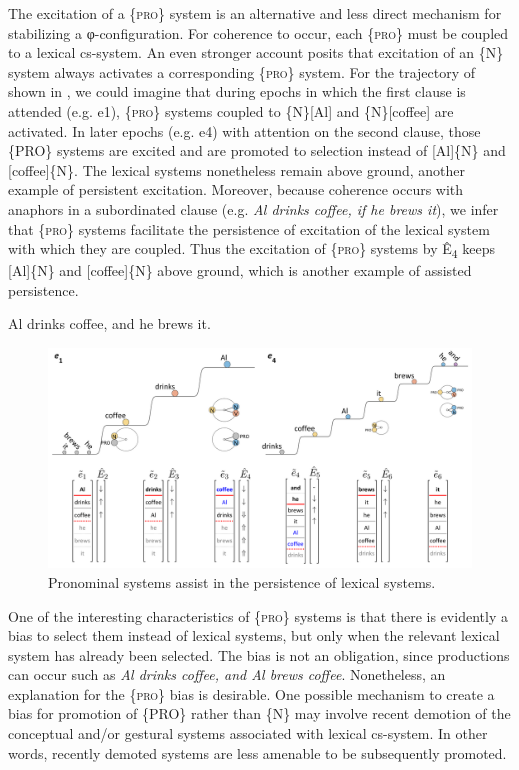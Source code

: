   The excitation of a \{\textsc{pro}\} system is an alternative and less direct mechanism for stabilizing a φ-configuration. For coherence to occur, each \{\textsc{pro}\} must be coupled to a lexical cs-system. An even stronger account posits that excitation of an \{N\} system always activates a corresponding \{\textsc{pro}\} system. For the trajectory of  shown in {}, we could imagine that during epochs in which the first clause is attended (e.g. e1), \{\textsc{pro}\} systems coupled to \{N\}[Al] and \{N\}[coffee] are activated. In later epochs (e.g. e4) with attention on the second clause, those \{PRO\} systems are excited and are promoted to selection instead of [Al]\{N\} and [coffee]\{N\}. The lexical systems nonetheless remain above ground, another example of persistent excitation. Moreover, because coherence occurs with anaphors in a subordinated clause (e.g. \textit{Al drinks coffee, if he brews it}), we infer that \{\textsc{pro}\} systems facilitate the persistence of excitation of the lexical system with which they are coupled. Thus the excitation of \{\textsc{pro}\} systems by Ê\textsubscript{4} keeps [Al]\{N\} and [coffee]\{N\} above ground, which is another example of assisted persistence.

  \ea\label{ex:7:10}
  {Al drinks coffee, and he brews it.}
\z
  
\begin{figure}
\includegraphics[width=\textwidth]{figures/Tilsen-img153.png}
\caption{Pronominal systems assist in the persistence of lexical systems.}
\label{fig:7:9}
\end{figure}
 

  One of the interesting characteristics of \{\textsc{pro}\} systems is that there is evidently a bias to select them instead of lexical systems, but only when the relevant lexical system has already been selected. The bias is not an obligation, since productions can occur such as \textit{Al drinks coffee, and Al brews coffee}. Nonetheless, an explanation for the \{\textsc{pro}\} bias is desirable. One possible mechanism to create a bias for promotion of \{PRO\} rather than \{N\} may involve recent demotion of the conceptual and/or gestural systems associated with lexical cs-system. In other words, recently demoted systems are less amenable to be subsequently promoted.

